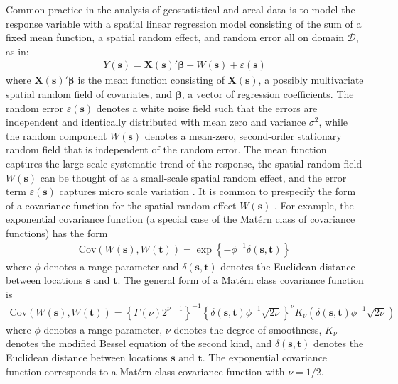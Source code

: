 \documentclass[authoryear, review, 11pt]{elsarticle}
\begin{document}
	 Common practice in the analysis of geostatistical and areal data is to model the response variable with a spatial linear regression model consisting of the sum of a fixed mean function, a spatial random effect, and random error all on domain $\mathcal{D}$, as in: 
\begin{align}\label{eq:spatial-regression}
    Y(\bm{s}) = \bm{X}(\bm{s})'\bm{\beta} + W(\bm{s}) + \varepsilon(\bm{s})
\end{align}
where $\bm{X}(\bm{s})'\bm{\beta}$ is the mean function consisting of $\bm{X}(\bm{s})$, a possibly multivariate spatial random field of covariates, and $\bm{\beta}$, a vector of regression coefficients. The random error $\varepsilon(\bm{s})$ denotes a white noise field such that the errors are independent and identically distributed with mean zero and variance $\sigma^2$, while the random component $W(\bm{s})$ denotes a mean-zero, second-order stationary random field that is independent of the random error. The mean function captures the large-scale systematic trend of the response, the spatial random field $W(\bm{s})$ can be thought of as a small-scale spatial random effect, and the error term $\varepsilon(\bm{s})$ captures micro scale variation \citep{Cressie:1993}. It is common to prespecify the form of a covariance function for the spatial random effect $W(\bm{s})$ \citep{Diggle:2007}. For example, the exponential covariance function (a special case of the Mat\'{e}rn class of covariance functions) has the form
\begin{align}\label{eq:exponential-covariance}
    \text{Cov}(W(\bm{s}), W(\bm{t})) = \exp\left\{-\phi^{-1} \delta(\bm{s}, \bm{t}) \right\}
\end{align}
where $\phi$ denotes a range parameter and $\delta(\bm{s}, \bm{t})$ denotes the Euclidean distance between locations $\bm{s}$ and $\bm{t}$. The general form of a Mat\'{e}rn class covariance function is
\begin{align}\label{eq:matern-covarinace}
    \text{Cov}(W(\bm{s}), W(\bm{t})) = \left\{\Gamma(\nu) 2^{\nu-1} \right\}^{-1} \left\{\delta(\bm{s}, \bm{t}) \phi^{-1}\sqrt{2\nu}\right\}^\nu K_{\nu} \left(\delta(\bm{s}, \bm{t}) \phi^{-1}\sqrt{2\nu}\right)
    \end{align}
where $\phi$ denotes a range parameter, $\nu$ denotes the degree of smoothness, $K_{\nu}$ denotes the modified Bessel equation of the second kind, and $\delta(\bm{s}, \bm{t})$ denotes the Euclidean distance between locations $\bm{s}$ and $\bm{t}$. The exponential covariance function corresponds to a Mat\'{e}rn class covariance function with $\nu = 1/2$.
\end{document}

